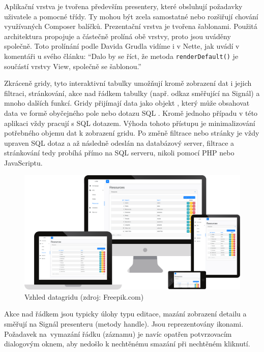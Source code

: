 Aplikační vrstva je tvořena především presentery, které obsluhují požadavky uživatele a pomocné třídy.  Ty mohou být zcela samostatné nebo rozšiřují chování využívaných Composer balíčků. Prezentační vrstva je tvořena šablonami. Použitá architektura propojuje a částečně prolíná obě vrstvy, proto jsou uváděny společně. Toto prolínání podle Davida Grudla vidíme i v Nette, jak uvádí v komentáři u svého článku: ``Dalo by se říct, že metoda \texttt{renderDefault()} je součástí vrstvy View, společně se šablonou.''






\clearpage
{}

 \label{section:Datagridy}
Zkráceně gridy, tyto interaktivní tabulky umožňují kromě zobrazení dat i jejich filtraci, stránkování, akce nad řádkem tabulky (např. odkaz směřující na Signál) a mnoho dalších funkcí. Gridy přijímají data jako objekt , který může obsahovat data ve formě obyčejného pole nebo dotazu SQL \cite{ContributteDataGrid}. Kromě jednoho případu v této aplikaci vždy pracují s SQL dotazem. Výhoda tohoto přístupu je minimalizování potřebného objemu dat k zobrazení gridu. Po změně filtrace nebo stránky je vždy upraven SQL dotaz a až následně odeslán na databázový server, filtrace a stránkování tedy probíhá přímo na SQL serveru, nikoli pomocí PHP nebo JavaScriptu.

\begin{figure}[h]
	\centering
	\includegraphics[width=\linewidth]{svg/mockup/datagrid.eps}
	\captionsetup{width=\linewidth}
	\caption[Vzhled datagridu]{Vzhled datagridu (zdroj: Freepik.com)}
	\label{mockup:login}
\end{figure}

Akce nad řádkem jsou typicky úlohy typu editace, mazání zobrazení detailu a směřují na Signál presenteru (metody handle). Jsou reprezentovány ikonami. Požadavek na~vymazání řádku (záznamu) je navíc opatřen potvrzovacím dialogovým oknem, aby nedošlo k nechtěnému smazání při nechtěném kliknutí.
